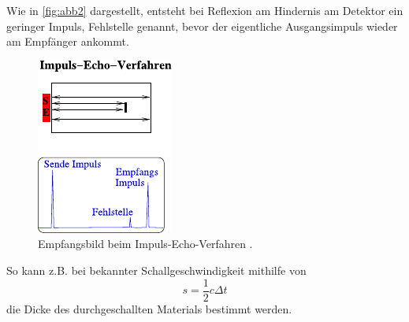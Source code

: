 Wie in \autoref{fig:abb2} dargestellt, entsteht bei Reflexion am Hindernis am Detektor ein geringer
Impuls, Fehlstelle genannt, bevor der eigentliche Ausgangsimpuls
wieder am Empfänger ankommt.

\begin{figure}
    \centering
    \includegraphics{figures/abb2.pdf}
    \caption{Empfangsbild beim Impuls-Echo-Verfahren \cite{ap06}.}
    \label{fig:abb2}
\end{figure}

So kann z.B. bei bekannter Schallgeschwindigkeit mithilfe von
\begin{equation}
    s = \dfrac{1}{2} c \Delta t
    \label{eq:schallges}
\end{equation}
die Dicke des durchgeschallten Materials bestimmt werden. 

